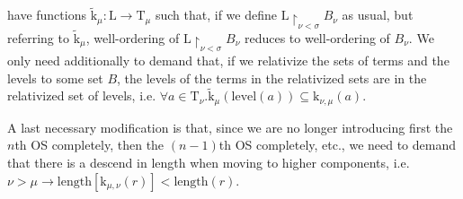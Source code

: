 \documentclass[10pt]{article}
\def\all{\forall}
\def\ar{\rightarrow}
\def\length{\mathrm{length}}
\def\k{\mathrm{k}}
\def\krmtil{\widetilde{\mathrm{k}}}
\def\C{\mathrm{C}}
\def\T{\mathrm{T}}
\def\L{\mathrm{L}}
\def\level{\mathrm{level}}
\def\calF{\mathcal{F}}
\def\calG{\mathcal{G}}
\begin{document}
have functions $\krmtil_\mu: \L \ar \T_\mu$ such that,
if we define $\L \restriction_{\nu<\sigma} B_\nu$ as usual,
but referring to $\krmtil_\mu$,
well-ordering of $\L \restriction_{\nu<\sigma} B_\nu$ 
reduces to well-ordering of $B_\nu$. We only need additionally to demand
that, if we relativize the sets of terms and the levels to some set $B$,
the levels of the terms in the relativized sets are in the 
relativized set  of levels, i.e.
$\all a \in \T_\nu.\krmtil_\mu(\level(a)) \subseteq 
\k_{\nu,\mu}(a)$.\par 
A last necessary modification is that, since we are no longer 
introducing first the $n$th OS completely, then the $(n-1)$th OS completely,
etc.,
we need to demand that there is a descend in length
when moving to higher components, 
i.e. $\nu> \mu \ar \length[\k_{\mu,\nu}(r)]< \length(r)$.\par 
%
%
%
\end{document}

